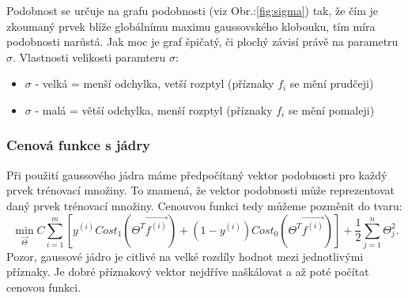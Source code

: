 \documentclass[a4]{article}
\begin{document}
\noindent Podobnost se určuje na grafu podobnosti (viz Obr.:\ref{fig:sigma}) tak, že čím je zkoumaný prvek blíže globálnímu maximu gaussovského klobouku, tím míra podobnosti narůstá. Jak moc je graf špičatý, či plochý závisí právě na parametru $\sigma$. Vlastnosti velikosti paramteru $\sigma$:

\begin{itemize}
	\item $\sigma$ - velká = menší odchylka, vetší rozptyl (příznaky $f_i$ se mění prudčeji)
	\item $\sigma$ - malá = větší odchylka, menší rozptyl (příznaky $f_i$ se mění pomaleji)
\end{itemize}

\subsubsection{Cenová funkce s jádry}
Při použití gaussového jádra máme předpočítaný vektor podobnosti pro každý prvek trénovací množiny. To znamená, že vektor podobnosti může reprezentovat daný prvek trénovací množiny. Cenouvou funkci tedy můžeme pozměnit do tvaru:
$$
\min_{\vec{\Theta}} C \sum_{i=1}^{m}[y^{(i)} Cost_1 (\Theta^T \vec{f^{(i)}})+(1-y^{(i)}) Cost_0 (\Theta^T \vec{f^{(i)}})] + \frac{1}{2} \sum_{j=1}^{n}\Theta_{j}^{2}.
$$
\noindent Pozor, gaussové jádro je citlivé na velké rozdíly hodnot mezi jednotlivými příznaky. Je dobré příznakový vektor nejdříve naškálovat a až poté počítat cenovou funkci.
\end{document}
